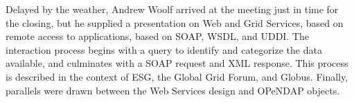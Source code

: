 Delayed by the weather, Andrew Woolf arrived at the meeting just in
time for the closing, but he supplied a presentation on Web and Grid
Services, based on remote access to applications, based on \ac{SOAP},
\ac{WSDL}, and \ac{UDDI}.  The interaction process begins with a query
to identify and categorize the data available, and culminates with a
\ac{SOAP} request and \ac{XML} response.  This process is described in
the context of \ac{ESG}, the Global Grid Forum, and Globus.  Finally,
parallels were drawn between the Web Services design and OPeNDAP
objects.

%
%
%
%

